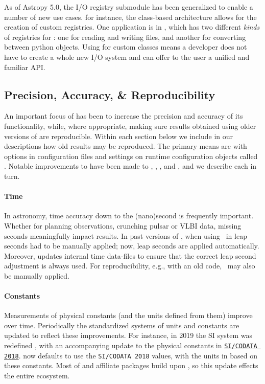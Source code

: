 \documentclass[modern]{aastex631}
\begin{document}
As of Astropy 5.0, the I/O registry submodule has been generalized to enable a
number of new use cases. for instance, the class-based architecture allows for
the creation of custom registries. One application is in \astropycosmology,
which has two different \textit{kinds} of registries for \astropyCosmology: one
for reading and writing files, and another for converting between python
objects. Using  for custom classes means a developer
does not have to create a whole new I/O system and can offer to the user a
unified and familiar API.


\subsection{Precision, Accuracy, \& Reproducibility}
\label{sec:core-features-precision_accuracy_repreducibility}

An important focus of \astropy has been to increase the precision and accuracy
of its functionality, while, where appropriate, making sure results obtained
using older versions of \astropypkg are reproducible. Within each section below
we include in our descriptions how old results may be reproduced. The primary
means are with options in configuration files and settings on runtime configuration
objects called \astropyScienceState. Notable improvements to \astropypkg have
been made to \astropytime, \astropyconstants, \astropycoordinates, and
\astropycosmology, and we describe each in turn.

\paragraph{Time}
In astronomy, time accuracy down to the (nano)second is frequently important.
Whether for planning observations, crunching pulsar or VLBI data, missing
seconds meaningfully impact results. In past versions of \astropypkg, when using
\astropyTime\ in \astropytime leap seconds had to be manually applied; now, leap
seconds are applied automatically. Moreover, \astropypkg updates internal time
data-files to ensure that the correct leap second adjustment is always used. For
reproducibility, e.g., with an old code, \astropyLeapSeconds\ may also be
manually applied.

\paragraph{Constants}

Measurements of physical constants (and the units defined from them) improve
over time. Periodically the standardized systems of units and constants are
updated to reflect these improvements. For instance, in 2019 the SI system was
redefined \citep{NIST2019}, with an accompanying update to the physical
constants in
\href{https://codata.org/initiatives/data-science-and-stewardship/fundamental-physical-constants/}{\texttt{SI/CODATA
2018}}. \astropyconstants now defaults to use the \texttt{SI/CODATA 2018}
values, with the units in \astropyunits based on these constants. Most of
\astropypkg and affiliate packages build upon \astropyunits, so this update
effects the entire \astropy ecosystem.
\end{document}
